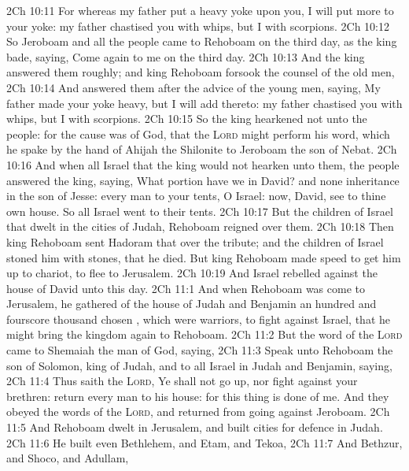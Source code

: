 \vs 2Ch 10:11 For whereas my father put a heavy yoke upon you, I will put more to your yoke: my father chastised you with whips, but I  with scorpions.
\vs 2Ch 10:12 So Jeroboam and all the people came to Rehoboam on the third day, as the king bade, saying, Come again to me on the third day.
\vs 2Ch 10:13 And the king answered them roughly; and king Rehoboam forsook the counsel of the old men,
\vs 2Ch 10:14 And answered them after the advice of the young men, saying, My father made your yoke heavy, but I will add thereto: my father chastised you with whips, but I  with scorpions.
\vs 2Ch 10:15 So the king hearkened not unto the people: for the cause was of God, that the \textsc{Lord} might perform his word, which he spake by the hand of Ahijah the Shilonite to Jeroboam the son of Nebat.
\vs 2Ch 10:16 And when all Israel  that the king would not hearken unto them, the people answered the king, saying, What portion have we in David? and  none inheritance in the son of Jesse: every man to your tents, O Israel:  now, David, see to thine own house. So all Israel went to their tents.
\vs 2Ch 10:17 But  the children of Israel that dwelt in the cities of Judah, Rehoboam reigned over them.
\vs 2Ch 10:18 Then king Rehoboam sent Hadoram that  over the tribute; and the children of Israel stoned him with stones, that he died. But king Rehoboam made speed to get him up to  chariot, to flee to Jerusalem.
\vs 2Ch 10:19 And Israel rebelled against the house of David unto this day.
\vs 2Ch 11:1 And when Rehoboam was come to Jerusalem, he gathered of the house of Judah and Benjamin an hundred and fourscore thousand chosen , which were warriors, to fight against Israel, that he might bring the kingdom again to Rehoboam.
\vs 2Ch 11:2 But the word of the \textsc{Lord} came to Shemaiah the man of God, saying,
\vs 2Ch 11:3 Speak unto Rehoboam the son of Solomon, king of Judah, and to all Israel in Judah and Benjamin, saying,
\vs 2Ch 11:4 Thus saith the \textsc{Lord}, Ye shall not go up, nor fight against your brethren: return every man to his house: for this thing is done of me. And they obeyed the words of the \textsc{Lord}, and returned from going against Jeroboam.
\vs 2Ch 11:5 And Rehoboam dwelt in Jerusalem, and built cities for defence in Judah.
\vs 2Ch 11:6 He built even Bethlehem, and Etam, and Tekoa,
\vs 2Ch 11:7 And Bethzur, and Shoco, and Adullam,
